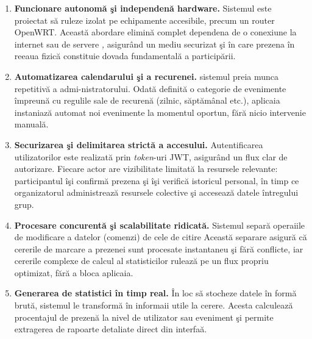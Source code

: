 \documentclass[11pt]{article}
\begin{document}
\begin{enumerate}
[leftmargin=*,label=\textbf{O\arabic*.}]

    \item \textbf{Funcionare autonom\u{a} \c{s}i independen\u{a} hardware.}
    Sistemul este proiectat s\u{a} ruleze  \newline izolat pe echipamente accesibile, precum un
    router OpenWRT. Aceast\u{a} abordare elimin\u{a} complet dependena de o conexiune
    la internet sau de servere \textit, asigur\^{a}nd
    un mediu securizat \c{s}i  \^{i}n care prezena \^{i}n reeaua fizic\u{a}
   constituie dovada fundamental\u{a} a particip\u{a}rii.
  

    \item \textbf{Automatizarea calendarului \c{s}i a recurenei.}
   sistemul preia
    munca repetitiv\u{a} a admi-nistratorului. Odat\u{a} definit\u{a} o categorie de evenimente
    \^{i}mpreun\u{a} cu regulile sale de recuren\u{a} (zilnic, s\u{a}pt\u{a}m\^{a}nal etc.), aplicaia
    instaniaz\u{a} automat noi evenimente la momentul oportun, f\u{a}r\u{a} nicio intervenie
    manual\u{a}.

    \item \textbf{Securizarea \c{s}i delimitarea strict\u{a} a accesului.}
    Autentificarea utilizatorilor este realizat\u{a} prin \textit{token}-uri JWT, asigur\^{a}nd
    un flux clar de autorizare. Fiecare actor are vizibilitate limitat\u{a} la resursele
    relevante: participantul \^{i}\c{s}i confirm\u{a} prezena \c{s}i \^{i}\c{s}i verific\u{a} istoricul
    personal, \^{i}n timp ce organizatorul administreaz\u{a} resursele colective \c{s}i
    acceseaz\u{a} datele \^{i}ntregului grup.

    \item \textbf{Procesare concurent\u{a} \c{s}i scalabilitate ridicat\u{a}.}
    Sistemul separ\u{a} operaiile de modificare a datelor (comenzi) de cele de citire
     Aceast\u{a} separare asigur\u{a} c\u{a} cererile de marcare a
    prezenei sunt procesate instantaneu \c{s}i f\u{a}r\u{a} conflicte, iar cererile complexe
    de calcul al statisticilor ruleaz\u{a} pe un flux propriu optimizat, f\u{a}r\u{a} a bloca
    aplicaia.
 

    \item \textbf{Generarea de statistici \^{i}n timp real.}
    \^{I}n loc s\u{a} stocheze datele \^{i}n form\u{a} brut\u{a}, sistemul le transform\u{a} \^{i}n informaii
    utile la cerere. Acesta calculeaz\u{a} procentajul de
    prezen\u{a} la nivel de utilizator sau eveniment \c{s}i permite extragerea de rapoarte
    detaliate direct din interfa\u{a}.
  

\end{enumerate}
\end{document}
